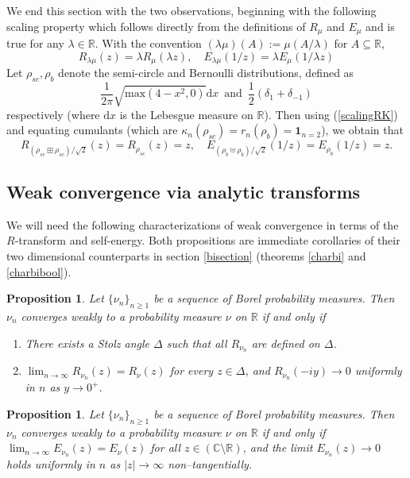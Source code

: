 \documentclass{amsart}
\newtheorem{proposition}[theorem]{Proposition}
\theoremstyle{definition}
\theoremstyle{remark}
\numberwithin{equation}{section}
\begin{document}
We end this section with the two observations, beginning with the following scaling property which follows directly from the definitions of $R_\mu$ and $E_\mu$ and is true for any $\lambda \in \mathbb{R}$. With the convention $(\lambda \mu)(A):=\mu(A/\lambda)$ for $A\subseteq \mathbb{R}$,
\begin{equation}\label{scalingRK} 
    R_{\lambda \mu}(z)=\lambda R_{\mu}(\lambda z), \quad E_{\lambda \mu}(1/z)=\lambda E_{\mu}(1/\lambda z)
\end{equation}
Let $\rho_{sc}, \rho_b$ denote the semi-circle and Bernoulli distributions, defined as
\[
    \frac{1}{2\pi}\sqrt{\text{max}(4-x^2,0)}\mathrm{d}x\,\text{ and } \,\frac{1}{2}(\delta_{1}+\delta_{-1})
\]
respectively (where $\mathrm{d}x$ is the Lebesgue measure on $\mathbb{R}$). Then using (\ref{scalingRK}) and equating cumulants (which are $\kappa_n(\rho_{sc})=r_n(\rho_b)=\mathbf{1}_{n=2}$), we obtain that 
 \begin{equation}\label{stability}
    R_{(\rho_{sc}\boxplus\rho_{sc})/\sqrt{2}}(z)=R_{\rho_{sc}}(z)=z, \quad E_{(\rho_b\uplus\rho_b)/\sqrt{2}}(1/z)=E_{\rho_b}(1/z)=z.
\end{equation}

\subsection{Weak convergence via analytic transforms} We will need the following characterizations of weak convergence in terms of the $R$-transform and self-energy. Both propositions are immediate corollaries of their two dimensional counterparts in section \ref{bisection} (theorems \ref{charbi} and \ref{charbibool}).
\begin{proposition}\label{Rconv}
        Let $\{\nu_n\}_{n\geq 1}$ be a sequence of Borel probability measures. Then $\nu_n$ converges weakly to a probability measure $\nu$ on $\mathbb{R}$ if and only if 
    \begin{enumerate}
        \item There exists a Stolz angle $\Delta$ such that all $R_{\nu_n}$ are defined on $\Delta$.
        \item $\lim_{n\to\infty}R_{\nu_n}(z)=R_\nu(z)$ for every $z\in \Delta$, and $R_{\nu_n}(-iy)\to 0$ uniformly in $n$ as $y\to 0^+$. 
    \end{enumerate}
\end{proposition}
\begin{proposition}\label{Econv} Let $\{\nu_n\}_{n\geq 1}$ be a sequence of Borel probability measures.  Then $\nu_n$ converges weakly to a probability measure $\nu$ on $\mathbb{R}$ if and only if 
 $\lim_{n\to \infty}E_{\nu_n}(z)=E_\nu(z)$ for all $z\in(\mathbb{C}\setminus\mathbb{R})$, and the limit $E_{\nu_n}(z)\to 0$ holds uniformly in $n$ as $|z|\to\infty$ non--tangentially.
\end{proposition}
\end{document}
